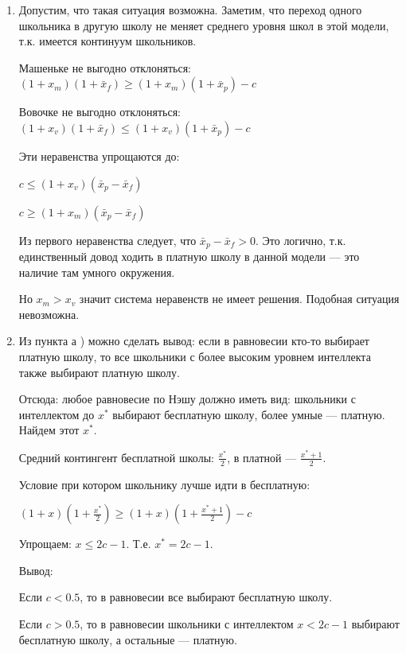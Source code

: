 \begin{problem}
\begin{sol}
\begin{enumerate}
\item Допустим, что такая ситуация возможна. Заметим, что переход одного школьника в другую школу не меняет среднего уровня школ в этой модели, т.к. имеется континуум школьников. \par
Машеньке не выгодно отклоняться: $(1+x_{m})(1+\bar{x}_{f})\ge (1+x_{m})(1+\bar{x}_{p})-c$ \par
Вовочке не выгодно отклоняться: $(1+x_{v})(1+\bar{x}_{f})\le (1+x_{v})(1+\bar{x}_{p})-c$ \par
Эти неравенства упрощаются до: \par
$c\le (1+x_{v})(\bar{x}_{p}-\bar{x}_{f})$ \par
$c\ge (1+x_{m})(\bar{x}_{p}-\bar{x}_{f})$ \par
Из первого неравенства следует, что $\bar{x}_{p}-\bar{x}_{f}>0$. Это логично, т.к. единственный довод ходить в платную школу в данной модели — это наличие там умного окружения. \par
Но $x_{m}>x_{v}$ значит система неравенств не имеет решения. Подобная ситуация невозможна. \par
\item Из пункта а ) можно сделать вывод: если в равновесии кто-то выбирает платную школу, то все школьники с более высоким уровнем интеллекта также выбирают платную школу. \par
Отсюда: любое равновесие по Нэшу должно иметь вид: школьники с интеллектом до $x^{*}$ выбирают бесплатную школу, более умные — платную. Найдем этот $x^{*}$. \par
Средний контингент бесплатной школы: $\frac{x^{*}}{2}$, в платной — $\frac{x^{*}+1}{2}$. \par
Условие при котором школьнику лучше идти в бесплатную: \par
$(1+x)(1+\frac{x^{*}}{2})\ge (1+x)(1+\frac{x^{*}+1}{2})-c$ \par
Упрощаем: $x\le 2c-1$. Т.е. $x^{*}=2c-1$. \par
Вывод: \par
Если $c<0.5$, то в равновесии все выбирают бесплатную школу. \par
Если $c>0.5$, то в равновесии школьники с интеллектом $x<2c-1$ выбирают бесплатную школу, а остальные — платную.
\end{enumerate}
\end{sol}
\end{problem}




